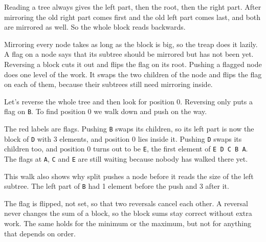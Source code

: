 Reading a tree always gives the left part, then the root, then the right part. After mirroring the old right part comes first and the old left part comes last, and both are mirrored as well. So the whole block reads backwards.

Mirroring every node takes as long as the block is big, so the treap does it lazily. A flag on a node says that its subtree should be mirrored but has not been yet. Reversing a block cuts it out and flips the flag on its root. Pushing a flagged node does one level of the work. It swaps the two children of the node and flips the flag on each of them, because their subtrees still need mirroring inside.

Let's reverse the whole tree and then look for position 0. Reversing only puts a flag on \texttt{B}. To find position 0 we walk down and push on the way.

\begin{center}
\end{center}
The red labels are flags. Pushing \texttt{B} swaps its children, so its left part is now the block of \texttt{D} with 3 elements, and position 0 lies inside it. Pushing \texttt{D} swaps its children too, and position 0 turns out to be \texttt{E}, the first element of \texttt{E D C B A}. The flags at \texttt{A}, \texttt{C} and \texttt{E} are still waiting because nobody has walked there yet.

This walk also shows why split pushes a node before it reads the size of the left subtree. The left part of \texttt{B} had 1 element before the push and 3 after it.

The flag is flipped, not set, so that two reversals cancel each other. A reversal never changes the sum of a block, so the block sums stay correct without extra work. The same holds for the minimum or the maximum, but not for anything that depends on order.


